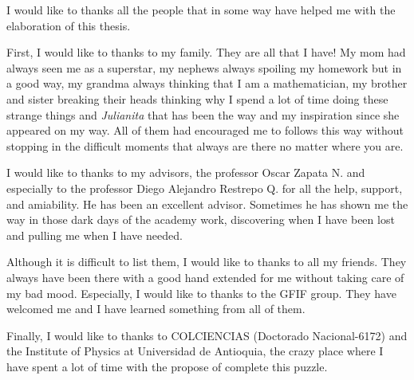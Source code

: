 \begin{acknowledgements}

I would like to thanks all the people that in some way have helped me with the elaboration of this thesis.

First, I would like to thanks to my family. They are all that I have! My mom had always seen me as a superstar, my nephews always spoiling my homework but in a good way, my grandma always thinking that I am a mathematician, my brother and sister breaking their heads thinking why I spend a lot of time doing these strange things and \textit{Julianita} that has  been the way and my inspiration since she appeared on my way. All of them had encouraged me to follows this way without stopping in the difficult moments that always are there no matter where you are.

I would like to thanks to my advisors, the professor Oscar Zapata N. and especially to the professor Diego Alejandro Restrepo Q. for all the help, support, and amiability. He has been an excellent advisor. Sometimes he has shown me the way in those dark days of the academy work, discovering when I have been lost and pulling me when I have needed. 

Although it is difficult to list them, I would like to thanks to all my friends.  They always have been there with a good hand extended for me without taking care of my bad mood. Especially, I would like to thanks to the GFIF group. They have welcomed me and I have learned something from all of them.

Finally, I would like to thanks to COLCIENCIAS (Doctorado Nacional-6172) and the Institute of Physics at Universidad de Antioquia, the crazy place where I have spent a lot of time with the propose of complete this puzzle.

\end{acknowledgements}